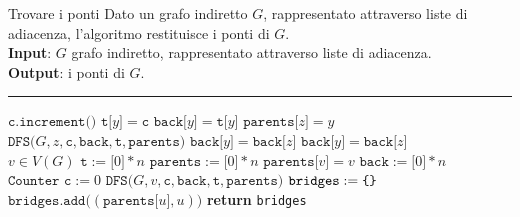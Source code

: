 \documentclass[a4paper, 12pt]{report}
\begin{document}
    \begin{framedalgo}{Trovare i ponti}
        Dato un grafo indiretto $G$, rappresentato attraverso liste di adiacenza, l'algoritmo restituisce i ponti di $G$.\\
        \textbf{Input}: $G$ grafo indiretto, rappresentato attraverso liste di adiacenza.\\
        \textbf{Output}: i ponti di $G$.

        \hrule
        \begin{algorithmic}[1]
                \State $\texttt{c.increment()}$
                \State $\texttt{t[}y\texttt{]}= \texttt{c}$
                \State $\texttt{back[}y\texttt{]}= \texttt{t[}y\texttt{]}$
                     
                        \State $\texttt{parents[}z\texttt{]}=y$
                        \State $\texttt{DFS(}G, z, \texttt{c}, \texttt{back}, \texttt{t}, \texttt{parents)}$
                            \State $\texttt{back[}y\texttt{]} = \texttt{back[}z\texttt{]}$
                        \EndIf
                        \State $\texttt{back[}y\texttt{]} = \texttt{back[}z\texttt{]}$
                    \EndIf
                \EndFor
            \EndFunction
            \\
                \State $v \in V(G)$ 
                \State $\texttt{t} := \texttt{[}0\texttt{]} * n$
                \State $\texttt{parents} := \texttt{[}0\texttt{]} * n$
                \State $\texttt{parents[}v\texttt{]}=v$
                \State $\texttt{back} := \texttt{[}0\texttt{]} * n$
                \State $\texttt{Counter c} := 0$ 
                \State $\texttt{DFS(}G, v, \texttt{c}, \texttt{back}, \texttt{t}, \texttt{parents)}$
                \State $\texttt{bridges} := \verb|{|\verb|}|$
                        \State $\texttt{bridges.add(}(\texttt{parents[}u\texttt{]}, u)\texttt{)}$
                    \EndIf
                \EndFor
                \State \textbf{return} \texttt{bridges}
            \EndFunction
        \end{algorithmic}
    \end{framedalgo}
\end{document}
